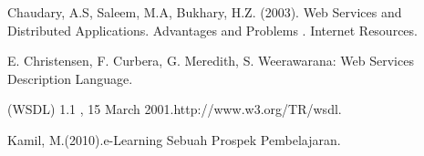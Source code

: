 \documentclass{jtetiproposalskripsi}
\begin{document}

\begin{thebibliography}{9}

Chaudary, A.S,  Saleem,  M.A,  Bukhary,  H.Z. (2003).  Web  Services  and Distributed Applications. Advantages and  Problems .  Internet Resources.

E. Christensen, F. Curbera,  G. Meredith, S. Weerawarana:  Web Services Description Language.

(WSDL) 1.1 , 15 March 2001.http://www.w3.org/TR/wsdl.

Kamil, M.(2010).e-Learning Sebuah Prospek Pembelajaran.

\end{thebibliography}
\end{document}

